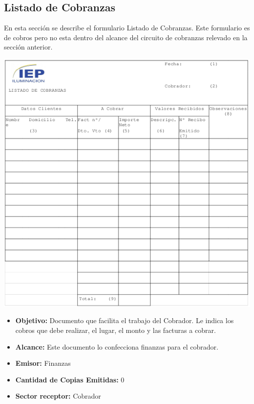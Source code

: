 \subsection{Listado de Cobranzas}
En esta sección se describe el formulario Listado de Cobranzas. Este formulario es de cobros pero no esta dentro del alcance del circuito de cobranzas relevado en la sección anterior.
\begin{center}
  \includegraphics[scale=0.6]{./Images/FormulariosIEP/listado_cobranzas_IEP.png}
\end{center}

\begin{itemize}
  \item \textbf{Objetivo:} Documento que facilita el trabajo del Cobrador. Le indica los cobros que debe realizar, el lugar, el monto y las facturas a cobrar.
  \item \textbf{Alcance:} Este documento lo confecciona finanzas para el cobrador.
  \item \textbf{Emisor:} Finanzas
  \item \textbf{Cantidad de Copias Emitidas:} 0
  \item \textbf{Sector receptor:} Cobrador
 \end{itemize}
 
